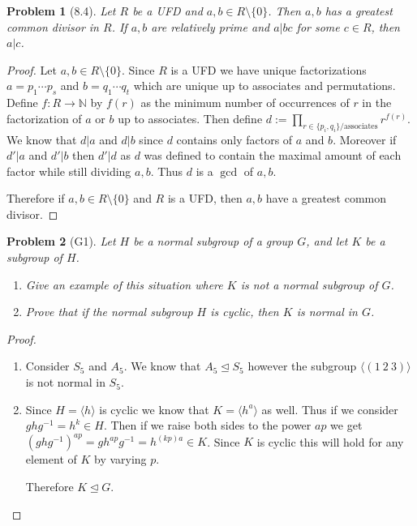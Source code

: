 \documentclass[10pt]{article}
\newcommand{\sk}{\vskip 10mm}
\newcommand{\bb}[1]{\mathbb{#1}}
\theoremstyle{plain}
\newtheorem{problem}{Problem}
\theoremstyle{remark}
\begin{document}
\sk

\begin{problem}[8.4]
  Let $R$ be a UFD and $a,b\in R\setminus\{0\}$. Then $a,b$ has a greatest
  common divisor in $R$. If $a,b$ are relatively prime and $a|bc$ for some
  $c\in R$, then $a|c$.
\end{problem}

\begin{proof}
  Let $a,b\in R\setminus\{0\}$. Since $R$ is a UFD we have unique factorizations
  $a=p_1\cdots p_s$ and $b=q_1\cdots q_t$ which are unique up to associates and permutations.
  Define $f:R\rightarrow \bb{N}$ by $f(r)$ as the minimum number of occurrences of
  $r$ in the factorization of $a$ or $b$ up to associates. Then
  define $d:=\prod_{r\in\{p_i,q_i\}/\text{associates}}r^{f(r)}$. We know that $d|a$ and $d|b$
  since $d$ contains only factors of $a$ and $b$. Moreover if $d'|a$ and $d'|b$
  then $d'|d$ as $d$ was defined to contain the maximal amount of each factor  while
  still dividing $a,b$. Thus $d$ is a $\gcd$ of $a,b$.

  Therefore if $a,b\in R\setminus\{0\}$ and $R$ is a UFD, then $a,b$ have a greatest common
  divisor.
\end{proof}

\sk

\begin{problem}[G1]
  Let $H$ be a normal subgroup of a group $G$, and let $K$ be a subgroup of $H$.
  \begin{enumerate}
  \item Give an example of this situation where $K$ is not a normal
    subgroup of $G$.
  \item Prove that if the normal subgroup $H$ is cyclic, then $K$ is normal
    in $G$.
  \end{enumerate}
\end{problem}

\begin{proof}
  \begin{enumerate}
  \item Consider $S_5$ and $A_5$. We know that $A_5\trianglelefteq S_5$ however
    the subgroup $\langle(1\ 2\ 3)\rangle$ is not normal in $S_5$.
  \item Since $H=\langle h\rangle$ is cyclic we know that $K=\langle h^a\rangle$ as well. Thus
    if we consider $ghg^{-1}=h^k\in H$. Then if we raise both sides to the
    power $ap$ we get $(ghg^{-1})^{ap}=gh^{ap}g^{-1}=h^{(kp)a}\in K$. Since
    $K$ is cyclic this will hold for any element of $K$ by varying $p$.

    Therefore $K\trianglelefteq G$.
  \end{enumerate}
\end{proof}
\end{document}

